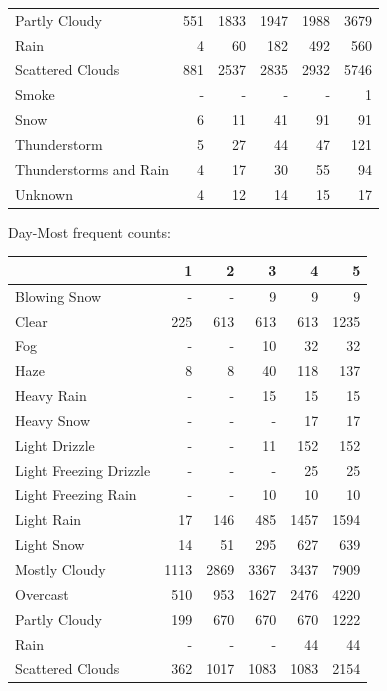 \documentclass[11pt]{scrartcl}
\begin{document}
\begin{tabular}{lrrrrr}
Partly Cloudy                       &   551 &  1833 &  1947 &  1988 &   3679 \\
Rain                                &     4 &    60 &   182 &   492 &    560 \\
Scattered Clouds                    &   881 &  2537 &  2835 &  2932 &   5746 \\
Smoke                               &   - &   - &   - &   - &      1 \\
Snow                                &     6 &    11 &    41 &    91 &     91 \\
Thunderstorm                        &     5 &    27 &    44 &    47 &    121 \\
Thunderstorms and Rain              &     4 &    17 &    30 &    55 &     94 \\
Unknown                             &     4 &    12 &    14 &    15 &     17 \\
\bottomrule
\end{tabular}
Day-Most frequent counts:
\begin{tabular}{lrrrrr}
\toprule
{} &     1 &     2 &     3 &     4 &     5 \\
\midrule
Blowing Snow           &   - &   - &     9 &     9 &     9 \\
Clear                  &   225 &   613 &   613 &   613 &  1235 \\
Fog                    &   - &   - &    10 &    32 &    32 \\
Haze                   &     8 &     8 &    40 &   118 &   137 \\
Heavy Rain             &   - &   - &    15 &    15 &    15 \\
Heavy Snow             &   - &   - &   - &    17 &    17 \\
Light Drizzle          &   - &   - &    11 &   152 &   152 \\
Light Freezing Drizzle &   - &   - &   - &    25 &    25 \\
Light Freezing Rain    &   - &   - &    10 &    10 &    10 \\
Light Rain             &    17 &   146 &   485 &  1457 &  1594 \\
Light Snow             &    14 &    51 &   295 &   627 &   639 \\
Mostly Cloudy          &  1113 &  2869 &  3367 &  3437 &  7909 \\
Overcast               &   510 &   953 &  1627 &  2476 &  4220 \\
Partly Cloudy          &   199 &   670 &   670 &   670 &  1222 \\
Rain                   &   - &   - &   - &    44 &    44 \\
Scattered Clouds       &   362 &  1017 &  1083 &  1083 &  2154 \\
\bottomrule
\end{tabular}
\end{document}
